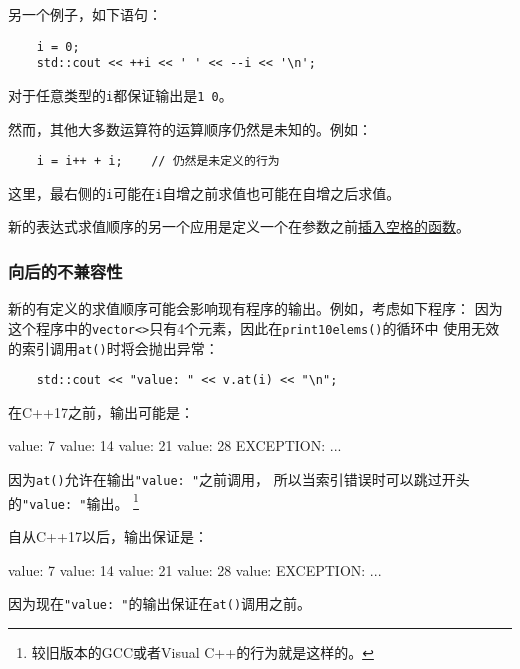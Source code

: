 另一个例子，如下语句：
\begin{lstlisting}
    i = 0;
    std::cout << ++i << ' ' << --i << '\n';
\end{lstlisting}
对于任意类型的\texttt{i}都保证输出是\texttt{1 0}。

然而，其他大多数运算符的运算顺序仍然是未知的。例如：
\begin{lstlisting}
    i = i++ + i;    // 仍然是未定义的行为
\end{lstlisting}
这里，最右侧的\texttt{i}可能在\texttt{i}自增之前求值也可能在自增之后求值。

新的表达式求值顺序的另一个应用是定义一个在参数之前\hyperref[ch11.2.1]{插入空格的函数}。

\subsubsection{向后的不兼容性}
新的有定义的求值顺序可能会影响现有程序的输出。例如，考虑如下程序：
因为这个程序中的\texttt{vector<>}只有4个元素，因此在\texttt{print10elems()}的循环中
使用无效的索引调用\texttt{at()}时将会抛出异常：
\begin{lstlisting}
    std::cout << "value: " << v.at(i) << "\n";
\end{lstlisting}
在C++17之前，输出可能是：
\begin{blacklisting}
    value: 7
    value: 14
    value: 21
    value: 28
    EXCEPTION: ...
\end{blacklisting}
因为\texttt{at()}允许在输出\texttt{"value: "}之前调用，
所以当索引错误时可以跳过开头的\texttt{"value: "}输出。
\footnote{较旧版本的GCC或者Visual C++的行为就是这样的。}

自从C++17以后，输出保证是：
\begin{blacklisting}
    value: 7
    value: 14
    value: 21
    value: 28
    value: EXCEPTION: ...
\end{blacklisting}
因为现在\texttt{"value: "}的输出保证在\texttt{at()}调用之前。

